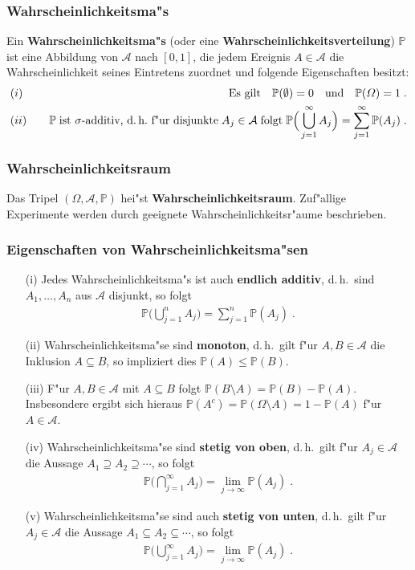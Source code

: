 \documentclass[ngerman,draft,parskip=half,twoside]{scrartcl}
\newcommand*{\Algeb}{\mathcal{A}}   %
\newcommand*{\WKM}{\mathbb{P}}      %
\begin{document}
\subsubsection{Wahrscheinlichkeitsma"s}
Ein \textbf{Wahrscheinlichkeitsma"s} (oder eine \textbf{Wahrscheinlichkeitsverteilung})
 $\WKM$ ist eine Abbildung von
$\Algeb$ nach $[0,1]$, die jedem Ereignis $A\in \Algeb$ die Wahrscheinlichkeit seines
Eintretens zuordnet und folgende Eigenschaften besitzt:
\begin{eqnarray*}
&(i)&\quad\mbox{Es gilt}\quad \WKM(\emptyset)=0\quad\mbox{und}\quad \WKM(\Omega)=1\;.\\
&(ii)&\quad
\WKM\;\mbox{ist $\sigma$-additiv, d.\,h.~f"ur disjunkte}\;A_j\in\Algeb\;\mbox{folgt}\;
\WKM\Big(\bigcup_{j=1}^\infty A_j\Big)=\sum_{j=1}^\infty\WKM(A_j)\;.
\end{eqnarray*}
\subsubsection{Wahrscheinlichkeitsraum}
Das Tripel $(\Omega,\Algeb,\WKM)$ hei"st \textbf{Wahrscheinlichkeitsraum}. Zuf"allige
Experimente werden durch geeignete Wahrscheinlichkeitsr"aume  beschrieben.
\subsubsection{Eigenschaften von Wahrscheinlichkeitsma"sen}
\begin{enumerate}
\item[\rm(i)]
Jedes Wahrscheinlichkeitsma"s ist auch \textbf{endlich additiv}, d.\,h.~sind
$A_1,\ldots,A_n$ aus $\Algeb$ disjunkt, so folgt
 \begin{gather*}
   \WKM\Big(\bigcup_{j=1}^n A_j\Big)=\sum_{j=1}^n\WKM(A_j)\;.
 \end{gather*}
\item[\rm(ii)]
Wahrscheinlichkeitsma"se sind \textbf{monoton}, d.\,h.~gilt f"ur $A,B\in\Algeb$ die Inklusion
$A\subseteq B$, so impliziert dies $\WKM(A)\le\WKM(B)$.
\item[\rm(iii)]
F"ur $A,B\in\Algeb$ mit $A\subseteq B$ folgt $\WKM(B\setminus A)=\WKM(B)-\WKM(A)$. Insbesondere ergibt sich hieraus
$\WKM(A^c)=\WKM(\Omega\setminus A)=1-\WKM(A)$ f"ur $A\in\Algeb$.
\item[\rm(iv)]
Wahrscheinlichkeitsma"se sind \textbf{stetig von oben}, d.\,h.~gilt f"ur $A_j\in\Algeb$
die Aussage $A_1\supseteq A_2\supseteq\cdots$,
so folgt
 \begin{gather*}
   \WKM\Big(\bigcap_{j=1}^\infty A_j\Big)=\lim_{j\to\infty}\WKM(A_j)\;.
 \end{gather*}
\item[\rm(v)]
Wahrscheinlichkeitsma"se sind auch \textbf{stetig von unten}, d.\,h.~gilt f"ur $A_j\in\Algeb$
die Aussage $A_1\subseteq A_2\subseteq\cdots$,
so folgt
  \begin{gather*}
    \WKM\Big(\bigcup_{j=1}^\infty A_j\Big)=\lim_{j\to\infty}\WKM(A_j)\;.
  \end{gather*}
\end{enumerate}
\end{document}
